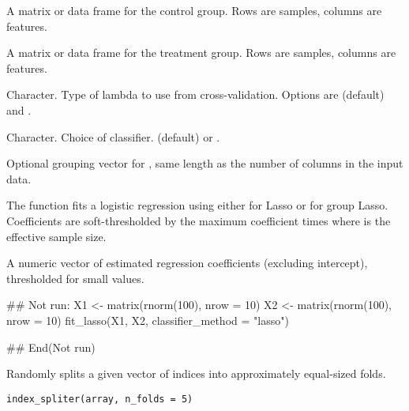 \documentclass[a4paper]{book}
\begin{document}
\begin{Arguments}
\begin{ldescription}
\item[\code{control\_train}] A matrix or data frame for the control group. Rows are samples, columns are features.

\item[\code{treat\_train}] A matrix or data frame for the treatment group. Rows are samples, columns are features.

\item[\code{lambda\_type}] Character. Type of lambda to use from cross-validation. Options are  (default) and .

\item[\code{classifier\_method}] Character. Choice of classifier.  (default) or .

\item[\code{group}] Optional grouping vector for , same length as the number of columns in the input data.
\end{ldescription}
\end{Arguments}
%
\begin{Details}
The function fits a logistic regression using either  for Lasso or  for group Lasso.
Coefficients are soft-thresholded by the maximum coefficient times  where  is the effective sample size.
\end{Details}
%
\begin{Value}
A numeric vector of estimated regression coefficients (excluding intercept), thresholded for small values.
\end{Value}
%
\begin{Examples}
\begin{ExampleCode}
## Not run: 
X1 <- matrix(rnorm(100), nrow = 10)
X2 <- matrix(rnorm(100), nrow = 10)
fit_lasso(X1, X2, classifier_method = "lasso")

## End(Not run)

\end{ExampleCode}
\end{Examples}
%
\begin{Description}
Randomly splits a given vector of indices into approximately equal-sized folds.
\end{Description}
%
\begin{Usage}
\begin{verbatim}
index_spliter(array, n_folds = 5)
\end{verbatim}
\end{Usage}
\end{document}
